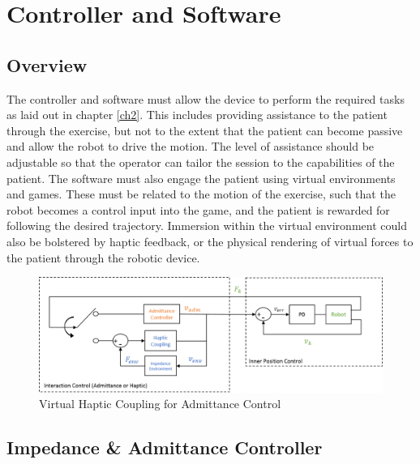 \documentclass[12pt]{report}
\begin{document}
	
		
\chapter{Controller and Software} \label{ch3}


	\section{Overview}
	
	The controller and software must allow the device to perform the required tasks as laid out in chapter \ref{ch2}. This includes providing assistance to the patient through the exercise, but not to the extent that the patient can become passive and allow the robot to drive the motion. The level of assistance should be adjustable so that the operator can tailor the session to the capabilities of the patient. The software must also engage the patient using virtual environments and games. These must be related to the motion of the exercise, such that the robot becomes a control input into the game, and the patient is rewarded for following the desired trajectory. Immersion within the virtual environment could also be bolstered by haptic feedback, or the physical rendering of virtual forces to the patient through the robotic device. 
	
	\begin{figure}[h] 
		\centering
		\includegraphics[width=\linewidth]{control_diagram2}
		\caption{Virtual Haptic Coupling for Admittance Control}
		\label{fig:software}
	\end{figure} 
	
	\section{Impedance \& Admittance Controller} \label{Sec:imp}

%
\end{document}
